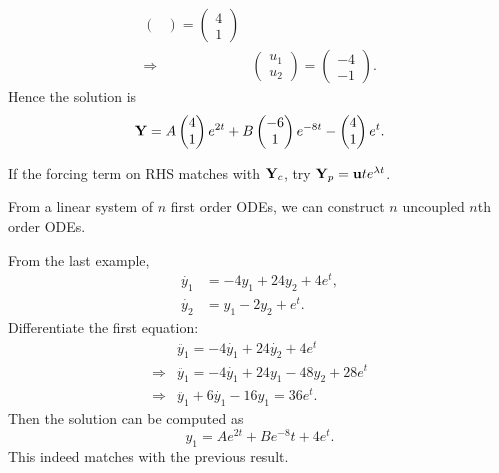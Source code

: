 \documentclass[10pt]{article}
\begin{document}
\begin{example}
\begin{align*}
\begin{pmatrix}
            \end{pmatrix} = \begin{pmatrix}
                4\\1
            \end{pmatrix}\\
            \Longrightarrow & \begin{pmatrix}
                u_1\\u_2
            \end{pmatrix}=\begin{pmatrix}
                -4\\-1
            \end{pmatrix}.
        \end{align*}
        Hence the solution is 
        \[
            {\bf Y} = A\begin{pmatrix}
                4\\1
            \end{pmatrix}e^{2t}+B\begin{pmatrix}
                -6\\1
            \end{pmatrix}e^{-8t}-\begin{pmatrix}
                4\\1
            \end{pmatrix}e^{t}.
        \]
    \end{example}
    \begin{remark}
        If the forcing term on RHS matches with $ {\bf Y}_c $, try $ {\bf Y}_p = {\bf u} t e^{\lambda t} $.
    \end{remark}
    From a linear system of $n$ first order ODEs, we can construct $n$ uncoupled $n$th order ODEs.
    \begin{example}
        From the last example,
        \begin{align*}
            \dot{y_1}&= -4y_1+24y_2+4e^t,\\
            \dot{y_2}&= y_1-2y_2+e^t.
        \end{align*}
        Differentiate the first equation:
        \begin{align*}
            &\ddot{y_1} = -4 \dot{y_1}+24 \dot{y_2}+4e^t\\
            \Longrightarrow & \ddot{y_1} = -4 \dot{y_1}+24y_1-48y_2+28e^t\\
            \Longrightarrow & \ddot{y_1} +6 \dot{y_1}-16y_1=36e^t.
        \end{align*}
        Then the solution can be computed as 
        \[
            y_1 = Ae^{2t}+Be^{-8}t+ 4e^{t}.
        \]
        This indeed matches with the previous result.
    \end{example}
\end{document}
